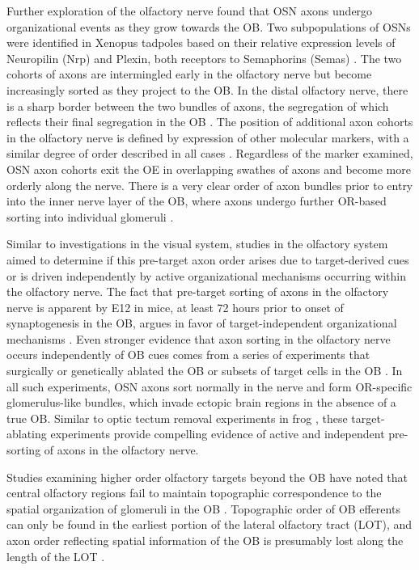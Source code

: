 Further exploration of the olfactory nerve found that OSN axons undergo organizational events as they grow towards the OB.
Two subpopulations of OSNs were identified in Xenopus tadpoles based on their relative expression levels of Neuropilin (Nrp) and Plexin, both receptors to Semaphorins (Semas) \cite{satoda1995differential}.
The two cohorts of axons are intermingled early in the olfactory nerve but become increasingly sorted as they project to the OB.
In the distal olfactory nerve, there is a sharp border between the two bundles of axons, the segregation of which reflects their final segregation in the OB \cite{satoda1995differential}.
The position of additional axon cohorts in the olfactory nerve is defined by expression of other molecular markers, with a similar degree of order described in all cases \cite{imai2009pre,miller2010axon}.
Regardless of the marker examined, OSN axon cohorts exit the OE in overlapping swathes of axons and become more orderly along the nerve.
There is a very clear order of axon bundles prior to entry into the inner nerve layer of the OB, where axons undergo further OR-based sorting into individual glomeruli \cite{imai2009pre,miller2010axon}.

Similar to investigations in the visual system, studies in the olfactory system aimed to determine if this pre-target axon order arises due to target-derived cues or is driven independently by active organizational mechanisms occurring within the olfactory nerve.
The fact that pre-target sorting of axons in the olfactory nerve is apparent by E12 in mice, at least 72 hours prior to onset of synaptogenesis in the OB, argues in favor of target-independent organizational mechanisms \cite{miller2010axon}.
Even stronger evidence that axon sorting in the olfactory nerve occurs independently of OB cues comes from a series of experiments that surgically \cite{graziadei1978regeneration} or genetically ablated the OB \cite{stjohn2003sorting} or subsets of target cells in the OB \cite{bulfone1998olfactory}.
In all such experiments, OSN axons sort normally in the nerve and form OR-specific glomerulus-like bundles, which invade ectopic brain regions in the absence of a true OB.
Similar to optic tectum removal experiments in frog \cite{reh1983organization}, these target-ablating experiments provide compelling evidence of active and independent pre-sorting of axons in the olfactory nerve.

Studies examining higher order olfactory targets beyond the OB have noted that central olfactory regions fail to maintain topographic correspondence to the spatial organization of glomeruli in the OB \cite{luskin1982distribution,sosulski2011distinct}.
Topographic order of OB efferents can only be found in the earliest portion of the lateral olfactory tract (LOT), and axon order reflecting spatial information of the OB is presumably lost along the length of the LOT \cite{price1975observation}.


